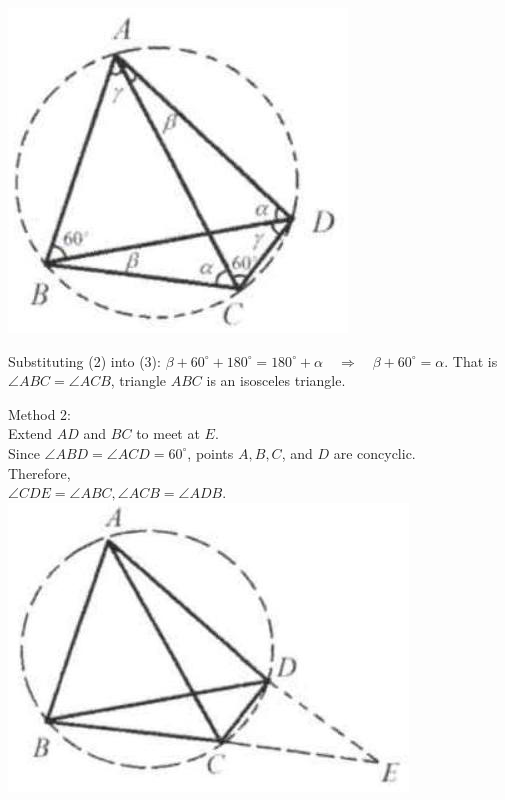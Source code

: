 \documentclass[10pt]{article}
\begin{document}
\includegraphics[max width=\textwidth, center]{2025_04_17_97bc1f7e44d93c271a88g-196(3)}


Substituting (2) into (3): \(\beta+60^{\circ}+180^{\circ}=180^{\circ}+\alpha \quad \Rightarrow \quad \beta+60^{\circ}=\alpha\). That is \(\angle A B C=\angle A C B\), triangle \(A B C\) is an isosceles triangle.

Method 2:\\
Extend \(A D\) and \(B C\) to meet at \(E\).\\
Since \(\angle A B D=\angle A C D=60^{\circ}\), points \(A, B, C\), and \(D\) are concyclic.\\
Therefore,\\
\(\angle C D E=\angle A B C, \angle A C B=\angle A D B\).\\
\includegraphics[max width=\textwidth, center]{2025_04_17_97bc1f7e44d93c271a88g-197}
\end{document}
